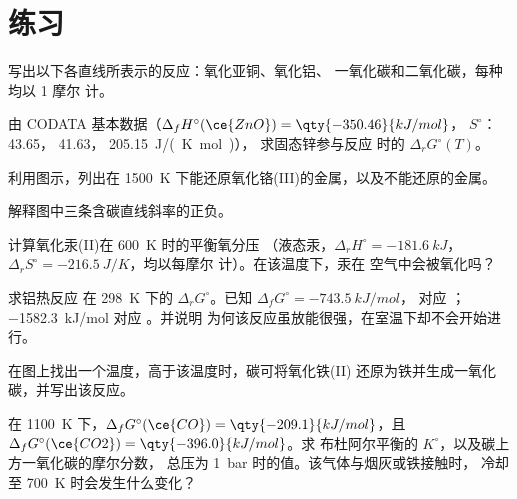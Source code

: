 \section{练习}

\begin{exercise}[$\star$]\label{exo:b2:ellingham:1}
写出以下各直线所表示的反应：氧化亚铜、氧化铝、
一氧化碳和二氧化碳，每种均以 1 摩尔  计。
\end{exercise}

\begin{exercise}[$\star$]\label{exo:b2:ellingham:2}
由 CODATA 基本数据（$\Delta_f H^\circ(\ce{ZnO}) = \qty{-350.46}{kJ/mol}$，
$S^\circ$： 43.65， 41.63， \qty{205.15}{J/(K.mol)}），
求固态锌参与反应  时的 $\Delta_r G^\circ(T)$。
\end{exercise}

\begin{exercise}[$\star$]\label{exo:b2:ellingham:3}
利用图示，列出在
\qty{1500}{K} 下能还原氧化铬(III)的金属，以及不能还原的金属。
\end{exercise}

\begin{exercise}[$\star$]\label{exo:b2:ellingham:4}
解释图中三条含碳直线斜率的正负。
\end{exercise}

\begin{exercise}[$\star\star$]\label{exo:b2:ellingham:5}
计算氧化汞(II)在 \qty{600}{K} 时的平衡氧分压
（液态汞，$\Delta_r H^\circ = \qty{-181.6}{kJ}$，$\Delta_r S^\circ =
\qty{-216.5}{J/K}$，均以每摩尔  计）。在该温度下，汞在
空气中会被氧化吗？
\end{exercise}

\begin{exercise}[$\star\star$]\label{exo:b2:ellingham:6}
求铝热反应  在 \qty{298}{K} 下的 $\Delta_r G^\circ$。已知 $\Delta_f G^\circ = \qty{-743.5}{kJ/mol}$，
对应 ；\qty{-1582.3}{kJ/mol} 对应 。并说明
为何该反应虽放能很强，在室温下却不会开始进行。
\end{exercise}

\begin{exercise}[$\star\star$]\label{exo:b2:ellingham:7}
在图上找出一个温度，高于该温度时，碳可将氧化铁(II)
还原为铁并生成一氧化碳，并写出该反应。
\end{exercise}

\begin{exercise}[$\star\star$]\label{exo:b2:ellingham:8}
在 \qty{1100}{K} 下，$\Delta_f G^\circ(\ce{CO}) = \qty{-209.1}{kJ/mol}$，且
$\Delta_f G^\circ(\ce{CO2}) = \qty{-396.0}{kJ/mol}$。求
布杜阿尔平衡的 $K^\circ$，以及碳上方一氧化碳的摩尔分数，
总压为 \qty{1}{bar} 时的值。该气体与烟灰或铁接触时，
冷却至 \qty{700}{K} 时会发生什么变化？
\end{exercise}

